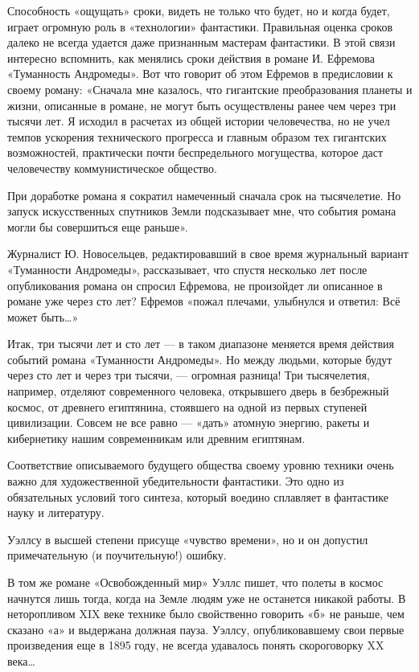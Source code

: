 Способность «ощущать» сроки, видеть не только что будет, но и когда будет,
играет огромную роль в  «технологии» фантастики. Правильная оценка  сроков
далеко не всегда удается даже признанным мастерам фантастики. В этой связи
интересно вспомнить,  как менялись  сроки действия  в романе  И.  Ефремова
«Туманность Андромеды». Вот что  говорит об этом  Ефремов в предисловии  к
своему  роману:  «Сначала  мне  казалось,  что  гигантские  преобразования
планеты и жизни, описанные в романе, не могут быть осуществлены ранее  чем
через три тысячи лет. Я исходил в расчетах из общей истории  человечества,
но не учел темпов ускорения  технического прогресса и главным образом  тех
гигантских  возможностей,  практически  почти  беспредельного  могущества,
которое даст человечеству коммунистическое общество.

При доработке романа я сократил намеченный сначала срок на тысячелетие. Но
запуск искусственных спутников Земли подсказывает мне, что события  романа
могли бы совершиться еще раньше».

Журналист Ю. Новосельцев, редактировавший в свое время журнальный  вариант
«Туманности Андромеды»,  рассказывает,  что  спустя  несколько  лет  после
опубликования романа он  спросил Ефремова,  не произойдет  ли описанное  в
романе уже через сто лет? Ефремов «пожал плечами, улыбнулся и ответил: Всё
может быть…»

Итак, три тысячи лет и сто лет — в таком диапазоне меняется время действия
событий романа  «Туманности Андромеды».  Но  между людьми,  которые  будут
через сто лет  и через три  тысячи, — огромная  разница! Три  тысячелетия,
например, отделяют современного  человека, открывшего  дверь в  безбрежный
космос, от  древнего египтянина,  стоявшего на  одной из  первых  ступеней
цивилизации. Совсем  не  все равно  —  «дать» атомную  энергию,  ракеты  и
кибернетику нашим современникам или древним египтянам.

Соответствие описываемого будущего  общества своему  уровню техники  очень
важно  для   художественной  убедительности   фантастики.  Это   одно   из
обязательных условий того синтеза, который воедино сплавляет в  фантастике
науку и литературу.

Уэллсу в  высшей  степени присуще  «чувство  времени», но  и  он  допустил
примечательную (и поучительную!) ошибку.

В том  же романе  «Освобожденный мир»  Уэллс пишет,  что полеты  в  космос
начнутся лишь тогда, когда на Земле людям уже не останется никакой работы.
В неторопливом XIX веке технике  было свойственно говорить «б» не  раньше,
чем сказано «а»  и выдержана должная  пауза. Уэллсу, опубликовавшему  свои
первые  произведения  еще  в  1895   году,  не  всегда  удавалось   понять
скороговорку XX века…

